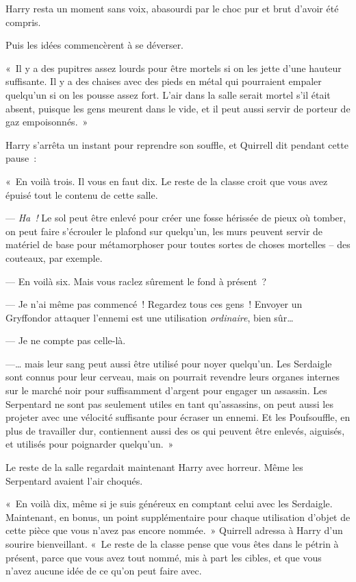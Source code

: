 Harry resta un moment sans voix, abasourdi par le choc pur et brut d'avoir été compris.

Puis les idées commencèrent à se déverser.

«~Il y a des pupitres assez lourds pour être mortels si on les jette d'une hauteur suffisante.
Il y a des chaises avec des pieds en métal qui pourraient empaler quelqu'un si on les pousse assez fort.
L'air dans la salle serait mortel s'il était absent, puisque les gens meurent dans le vide, et il peut aussi servir de porteur de gaz empoisonnés.~»

Harry s'arrêta un instant pour reprendre son souffle, et Quirrell dit pendant cette pause~:

«~En voilà trois.
Il vous en faut dix.
Le reste de la classe croit que vous avez épuisé tout le contenu de cette salle.

--- \emph{Ha~!} Le sol peut être enlevé pour créer une fosse hérissée de pieux où tomber, on peut faire s'écrouler le plafond sur quelqu'un, les murs peuvent servir de matériel de base pour métamorphoser pour toutes sortes de choses mortelles -- des couteaux, par exemple.

--- En voilà six. Mais vous raclez sûrement le fond à présent~?

--- Je n'ai même pas commencé~!
Regardez tous ces gens~!
Envoyer un Gryffondor attaquer l'ennemi est une utilisation \emph{ordinaire}, bien sûr…

--- Je ne compte pas celle-là.

---… mais leur sang peut aussi être utilisé pour noyer quelqu'un.
Les Serdaigle sont connus pour leur cerveau, mais on pourrait revendre leurs organes internes sur le marché noir pour suffisamment d'argent pour engager un assassin.
Les Serpentard ne sont pas seulement utiles en tant qu'assassins, on peut aussi les projeter avec une vélocité suffisante pour écraser un ennemi.
Et les Poufsouffle, en plus de travailler dur, contiennent aussi des os qui peuvent être enlevés, aiguisés, et utilisés pour poignarder quelqu'un.~»

Le reste de la salle regardait maintenant Harry avec horreur.
Même les Serpentard avaient l'air choqués.

«~En voilà dix, même si je suis généreux en comptant celui avec les Serdaigle.
Maintenant, en bonus, un point supplémentaire pour chaque utilisation d'objet de cette pièce que vous n'avez pas encore nommée.~»
Quirrell adressa à Harry d'un sourire bienveillant.
«~Le reste de la classe pense que vous êtes dans le pétrin à présent, parce que vous avez tout nommé, mis à part les cibles, et que vous n'avez aucune idée de ce qu'on peut faire avec.

